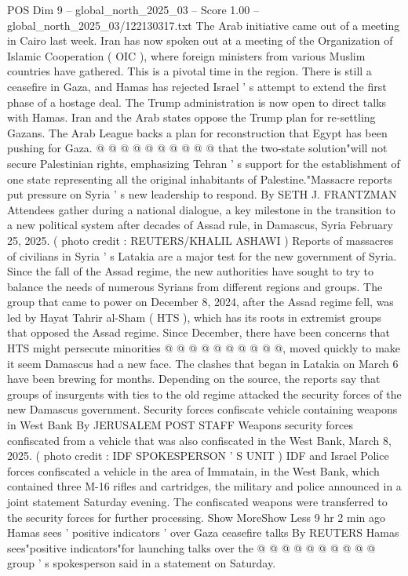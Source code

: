 \begin{textsample}{POS Dim 9 – global\_north\_2025\_03 – Score 1.00 – global\_north\_2025\_03/122130317.txt}
The Arab initiative came out of a meeting in Cairo last week.
Iran has now spoken out at a meeting of the Organization of Islamic Cooperation ( OIC ), where foreign ministers from various Muslim countries have gathered.
This is a pivotal time in the region.
There is still a ceasefire in Gaza, and Hamas has rejected Israel ' s attempt to extend the first phase of a hostage deal.
The Trump administration is now open to direct talks with Hamas.
Iran and the Arab states oppose the Trump plan for re-settling Gazans.
The Arab League backs a plan for reconstruction that Egypt has been pushing for Gaza. @ @ @ @ @ @ @ @ @ @ that the two-state solution"will not secure Palestinian rights, emphasizing Tehran ' s support for the establishment of one state representing all the original inhabitants of Palestine."Massacre reports put pressure on Syria ' s new leadership to respond.
By SETH J.
FRANTZMAN Attendees gather during a national dialogue, a key milestone in the transition to a new political system after decades of Assad rule, in Damascus, Syria February 25, 2025. ( photo credit : REUTERS/KHALIL ASHAWI ) Reports of massacres of civilians in Syria ' s Latakia are a major test for the new government of Syria.
Since the fall of the Assad regime, the new authorities have sought to try to balance the needs of numerous Syrians from different regions and groups.
The group that came to power on December 8, 2024, after the Assad regime fell, was led by Hayat Tahrir al-Sham ( HTS ), which has its roots in extremist groups that opposed the Assad regime.
Since December, there have been concerns that HTS might persecute minorities @ @ @ @ @ @ @ @ @ @, moved quickly to make it seem Damascus had a new face.
The clashes that began in Latakia on March 6 have been brewing for months.
Depending on the source, the reports say that groups of insurgents with ties to the old regime attacked the security forces of the new Damascus government.
Security forces confiscate vehicle containing weapons in West Bank By JERUSALEM POST STAFF Weapons security forces confiscated from a vehicle that was also confiscated in the West Bank, March 8, 2025. ( photo credit : IDF SPOKESPERSON ' S UNIT ) IDF and Israel Police forces confiscated a vehicle in the area of Immatain, in the West Bank, which contained three M-16 rifles and cartridges, the military and police announced in a joint statement Saturday evening.
The confiscated weapons were transferred to the security forces for further processing.
Show MoreShow Less 9 hr 2 min ago Hamas sees ' positive indicators ' over Gaza ceasefire talks By REUTERS Hamas sees"positive indicators"for launching talks over the @ @ @ @ @ @ @ @ @ @ group ' s spokesperson said in a statement on Saturday.

\end{textsample}

